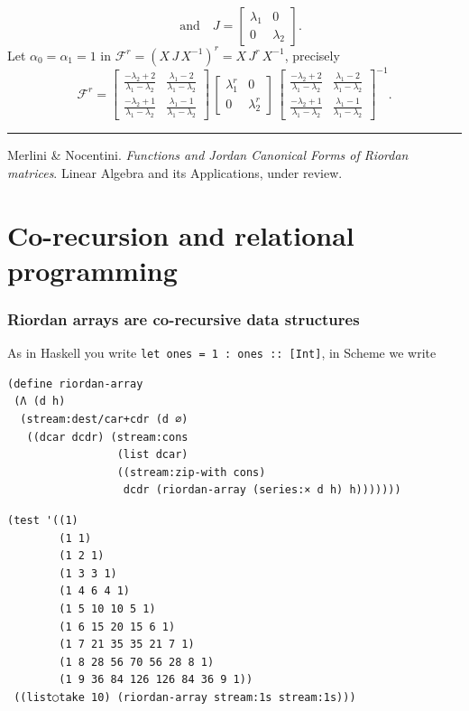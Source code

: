 \documentclass[9pt]{beamer}
\begin{document}
\begin{frame}[fragile]
\begin{displaymath}
\quad\text{and}\quad J = \left[\begin{matrix}\lambda_{1} & 0\\0 & \lambda_{2}\end{matrix}\right].
\end{displaymath}
Let $\alpha_{0} = \alpha_{1} = 1$ in
$\displaystyle \mathcal{F}^{r} = \left(X\,J\,X^{-1}\right)^{r} = X\,J^{r}\,X^{-1}$, precisely
$$\mathcal{F}^{r}=\left[\begin{matrix}\frac{- \lambda_{2} + 2}{\lambda_{1} - \lambda_{2}} & \frac{\lambda_{1} - 2}{\lambda_{1} - \lambda_{2}}\\\frac{- \lambda_{2} + 1}{\lambda_{1} - \lambda_{2}} & \frac{\lambda_{1} - 1}{\lambda_{1} - \lambda_{2}}\end{matrix}\right]\,\left[\begin{matrix}\lambda_{1}^{r} & 0\\0 & \lambda_{2}^{r}\end{matrix}\right]\,\left[\begin{matrix}\frac{- \lambda_{2} + 2}{\lambda_{1} - \lambda_{2}} & \frac{\lambda_{1} - 2}{\lambda_{1} - \lambda_{2}}\\\frac{- \lambda_{2} + 1}{\lambda_{1} - \lambda_{2}} & \frac{\lambda_{1} - 1}{\lambda_{1} - \lambda_{2}}\end{matrix}\right]^{-1}.$$
\vfill
\noindent\rule{\textwidth}{0.1pt}
{\footnotesize
Merlini \& Nocentini. \textit{Functions and Jordan Canonical Forms of Riordan
matrices}. \newline Linear Algebra and its Applications, under review.}
\end{frame}

\fi

\section{Co-recursion and relational programming}

\begin{frame}[fragile]
\frametitle{Riordan arrays are co-recursive data structures}

As in Haskell you write \texttt{let ones = 1 : ones :: [Int]}, in Scheme we write
\begin{verbatim}
(define riordan-array
 (Λ (d h)
  (stream:dest/car+cdr (d ∅)
   ((dcar dcdr) (stream:cons
                 (list dcar)
                 ((stream:zip-with cons)
                  dcdr (riordan-array (series:× d h) h)))))))
\end{verbatim}

\begin{verbatim}
(test '((1)
        (1 1)
        (1 2 1)
        (1 3 3 1)
        (1 4 6 4 1)
        (1 5 10 10 5 1)
        (1 6 15 20 15 6 1)
        (1 7 21 35 35 21 7 1)
        (1 8 28 56 70 56 28 8 1)
        (1 9 36 84 126 126 84 36 9 1))
 ((list○take 10) (riordan-array stream:1s stream:1s)))
\end{verbatim}
\end{frame}
\end{document}
